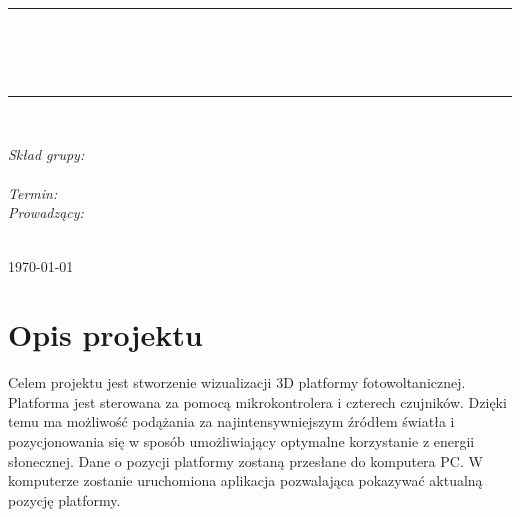 \documentclass[10pt, a4paper]{article}
\begin{document}
\def\tablename{Tabela}	%

\begin{titlepage}
	\begin{center}
		\textsc{\LARGE \formakursu}\\[1cm]		
		\textsc{\Large \kurs}\\[0.5cm]		
		\rule{\textwidth}{0.08cm}\\[0.4cm]
		{\huge \bfseries \doctype}\\[1cm]
		{\huge \bfseries \projectname}\\[0.5cm]
		\rule{\textwidth}{0.08cm}\\[1cm]
		
		\begin{flushright} \large
		\emph{Skład grupy:}\\
		\osobaA\\[0.4cm]
		
		\emph{Termin: }\termin\\[0.4cm]

		\emph{Prowadzący:} \\
		\prowadzacy \\
		
		\end{flushright}
		
		\vfill
		
		{\large \today}
	\end{center}	
\end{titlepage}

\newpage
\tableofcontents
\newpage

\section{Opis projektu}
\label{sec:OpisProjektu}

Celem projektu jest stworzenie wizualizacji 3D platformy fotowoltanicznej. Platforma jest sterowana za pomocą mikrokontrolera i czterech czujników. Dzięki temu ma możliwość podążania za najintensywniejszym źródłem światła i pozycjonowania się w sposób umożliwiający optymalne korzystanie z energii słonecznej. Dane o pozycji platformy zostaną przesłane do komputera PC. W komputerze zostanie uruchomiona aplikacja pozwalająca pokazywać aktualną pozycję platformy.
\newline
\newline
\end{document}
